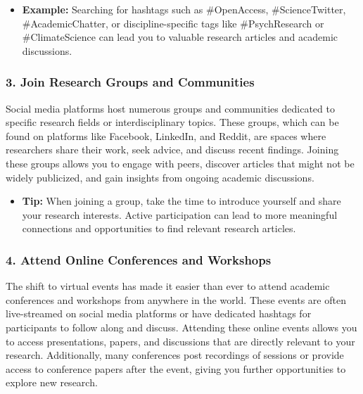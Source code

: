 \documentclass[
]{book}
\providecommand{\tightlist}{%
  \setlength{\itemsep}{0pt}\setlength{\parskip}{0pt}}
\begin{document}
\begin{itemize}
\tightlist
\item
  \textbf{Example:} Searching for hashtags such as \#OpenAccess, \#ScienceTwitter, \#AcademicChatter, or discipline-specific tags like \#PsychResearch or \#ClimateScience can lead you to valuable research articles and academic discussions.
\end{itemize}

\subsubsection*{3. Join Research Groups and Communities}\label{join-research-groups-and-communities}

Social media platforms host numerous groups and communities dedicated to specific research fields or interdisciplinary topics. These groups, which can be found on platforms like Facebook, LinkedIn, and Reddit, are spaces where researchers share their work, seek advice, and discuss recent findings. Joining these groups allows you to engage with peers, discover articles that might not be widely publicized, and gain insights from ongoing academic discussions.

\begin{itemize}
\tightlist
\item
  \textbf{Tip:} When joining a group, take the time to introduce yourself and share your research interests. Active participation can lead to more meaningful connections and opportunities to find relevant research articles.
\end{itemize}

\subsubsection*{4. Attend Online Conferences and Workshops}\label{attend-online-conferences-and-workshops}

The shift to virtual events has made it easier than ever to attend academic conferences and workshops from anywhere in the world. These events are often live-streamed on social media platforms or have dedicated hashtags for participants to follow along and discuss. Attending these online events allows you to access presentations, papers, and discussions that are directly relevant to your research. Additionally, many conferences post recordings of sessions or provide access to conference papers after the event, giving you further opportunities to explore new research.
\end{document}
